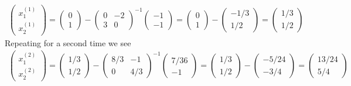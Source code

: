 \documentclass[12pt,a4paper]{article}
\begin{document}
\begin{align*}
\begin{pmatrix}
x_{1}^{(1)} \\ x_{2}^{(1)}
\end{pmatrix} 
=
\begin{pmatrix}
0 \\ 1
\end{pmatrix} 
-
\begin{pmatrix}
0 & -2 \\
3 & 0
\end{pmatrix}^{-1}
\begin{pmatrix}
-1 \\ -1
\end{pmatrix}
=
\begin{pmatrix}
0 \\ 1
\end{pmatrix} 
-
\begin{pmatrix}
-1/3 \\ 1/2
\end{pmatrix} 
=
\begin{pmatrix}
1/3 \\ 1/2
\end{pmatrix}
\end{align*}
Repeating for a second time we see
\begin{align*}
\begin{pmatrix}
x_{1}^{(2)} \\ x_{2}^{(2)}
\end{pmatrix} 
=
\begin{pmatrix}
1/3 \\ 1/2
\end{pmatrix} 
-
\begin{pmatrix}
8/3 & -1 \\
0 & 4/3
\end{pmatrix}^{-1}
\begin{pmatrix}
7/36 \\ -1
\end{pmatrix}
=
\begin{pmatrix}
1/3 \\ 1/2
\end{pmatrix} 
-
\begin{pmatrix}
-5/24 \\ -3/4
\end{pmatrix} 
=
\begin{pmatrix}
13/24 \\ 5/4
\end{pmatrix}
\end{align*}
\end{document}
